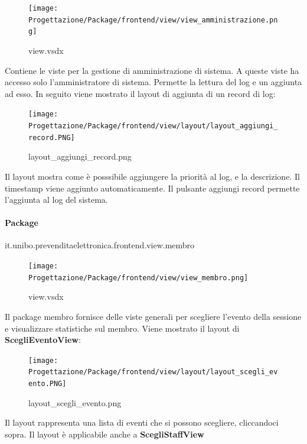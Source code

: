 \documentclass[a4paper]{article}
\begin{document}

\begin{figure}[H]
    \texttt{[image: Progettazione/Package/frontend/view/view\_amministrazione.png]}
    \centering
    \caption{view.vsdx}
\end{figure}

Contiene le viste per la gestione di amministrazione di sistema. A queste viste ha accesso solo l'amministratore di sistema. Permette la lettura del log e un aggiunta ad esso. In seguito viene mostrato il layout di aggiunta di un record di log:

\begin{figure}[H]
    \texttt{[image: Progettazione/Package/frontend/view/layout/layout\_aggiungi\_record.PNG]}
    \centering
    \caption{layout\_aggiungi\_record.png}
\end{figure}

Il layout mostra come è posssibile aggiungere la priorità al log, e la descrizione. Il timestamp viene aggiunto automaticamente. Il pulsante aggiungi record permette l'aggiunta al log del sistema.

\newpage

\paragraph{Package} it.unibo.prevenditaelettronica.frontend.view.membro


\begin{figure}[H]
    \texttt{[image: Progettazione/Package/frontend/view/view\_membro.png]}
    \centering
    \caption{view.vsdx}
\end{figure}

Il package membro fornisce delle viste generali per scegliere l'evento della sessione e visualizzare statistiche sul membro. Viene mostrato il layout di \textbf{ScegliEventoView}:

\begin{figure}[H]
    \texttt{[image: Progettazione/Package/frontend/view/layout/layout\_scegli\_evento.PNG]}
    \centering
    \caption{layout\_scegli\_evento.png}
\end{figure}

Il layout rappresenta una lista di eventi che si possono scegliere, cliccandoci sopra. Il layout è applicabile anche a \textbf{ScegliStaffView}
\end{document}
